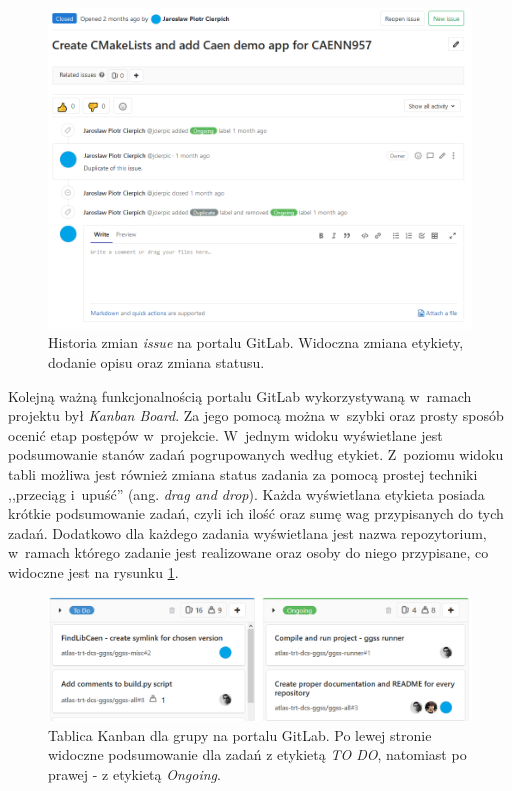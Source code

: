 \begin{figure}[H]
\centering
\includegraphics[width=\textwidth]{res/png/issueOngoing}
\caption{Historia zmian \textit{issue} na portalu GitLab. Widoczna zmiana etykiety, dodanie opisu oraz zmiana statusu.}
\end{figure}

\newpage

Kolejną ważną funkcjonalnością portalu GitLab wykorzystywaną w~ramach projektu był \textit{Kanban Board}. Za jego pomocą można w~szybki oraz prosty sposób ocenić etap postępów w~projekcie. W~jednym widoku wyświetlane jest podsumowanie stanów zadań pogrupowanych według etykiet. Z~poziomu widoku tabli możliwa jest również zmiana status zadania za pomocą prostej techniki ,,przeciąg i~upuść'' (ang. \textit{drag and drop}). Każda wyświetlana etykieta posiada krótkie podsumowanie zadań, czyli ich ilość oraz sumę wag przypisanych do tych zadań. Dodatkowo dla każdego zadania wyświetlana jest nazwa repozytorium, w~ramach którego zadanie jest realizowane oraz osoby do niego przypisane, co widoczne jest na rysunku \ref{fig:kanban}.

\begin{figure}[H]
\centering
\includegraphics[width=\textwidth]{res/png/kanban}
\caption{Tablica Kanban dla grupy na portalu GitLab. Po lewej stronie widoczne podsumowanie dla zadań z etykietą \textit{TO DO}, natomiast po prawej - z etykietą \textit{Ongoing}.}
\label{fig:kanban}
\end{figure}


